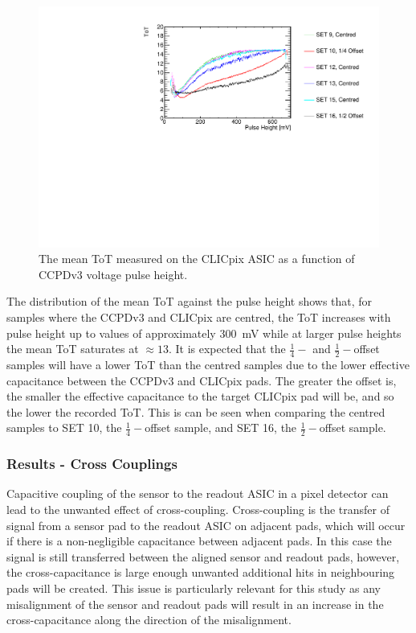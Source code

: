 \begin{figure}[h!]
\centering
\includegraphics[width=1.0\textwidth]{CLICdpVertex/Plots/RadSourceAnalysis/AllSETs_TargetTot_PulseHeight.pdf}
\caption[The mean ToT measured on the CLICpix ASIC as a function of CCPDv3 voltage pulse height.]{The mean ToT measured on the CLICpix ASIC as a function of CCPDv3 voltage pulse height.}
\label{fig:tot}
\end{figure}

The distribution of the mean ToT against the pulse height shows that, for samples where the CCPDv3 and CLICpix are centred, the ToT increases with pulse height up to values of approximately 300~mV while at larger pulse heights the mean ToT saturates at $\approx 13$.  It is expected that the $\frac{1}{4}-$ and $\frac{1}{2}-$offset samples will have a lower ToT than the centred samples due to the lower effective capacitance between the CCPDv3 and CLICpix pads.  The greater the offset is, the smaller the effective capacitance to the target CLICpix pad will be, and so the lower the recorded ToT.  This is can be seen when comparing the centred samples to SET 10, the $\frac{1}{4}-$offset sample, and SET 16, the $\frac{1}{2}-$offset sample.  


\subsubsection{Results - Cross Couplings}
Capacitive coupling of the sensor to the readout ASIC in a pixel detector can lead to the unwanted effect of cross-coupling.  Cross-coupling is the transfer of signal from a sensor pad to the readout ASIC on adjacent pads, which will occur if there is a non-negligible capacitance between adjacent pads.  In this case the signal is still transferred between the aligned sensor and readout pads, however, the cross-capacitance is large enough unwanted additional hits in neighbouring pads will be created.  This issue is particularly relevant for this study as any misalignment of the sensor and readout pads will result in an increase in the cross-capacitance along the direction of the misalignment.   

